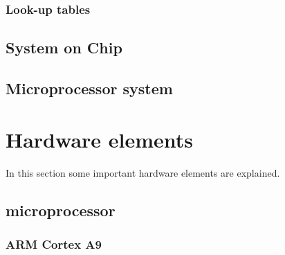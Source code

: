 \subsubsection{Look-up tables}
\subsection{System on Chip}
\subsection{Microprocessor system}

\section{Hardware elements}
In this section some important hardware elements are explained.
\subsection{microprocessor}

\subsubsection{ARM Cortex A9}
